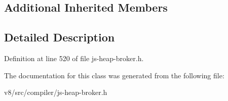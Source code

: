 \subsection*{Additional Inherited Members}


\subsection{Detailed Description}


Definition at line 520 of file js-\/heap-\/broker.\+h.



The documentation for this class was generated from the following file\+:\begin{DoxyCompactItemize}
\item 
v8/src/compiler/js-\/heap-\/broker.\+h\end{DoxyCompactItemize}
